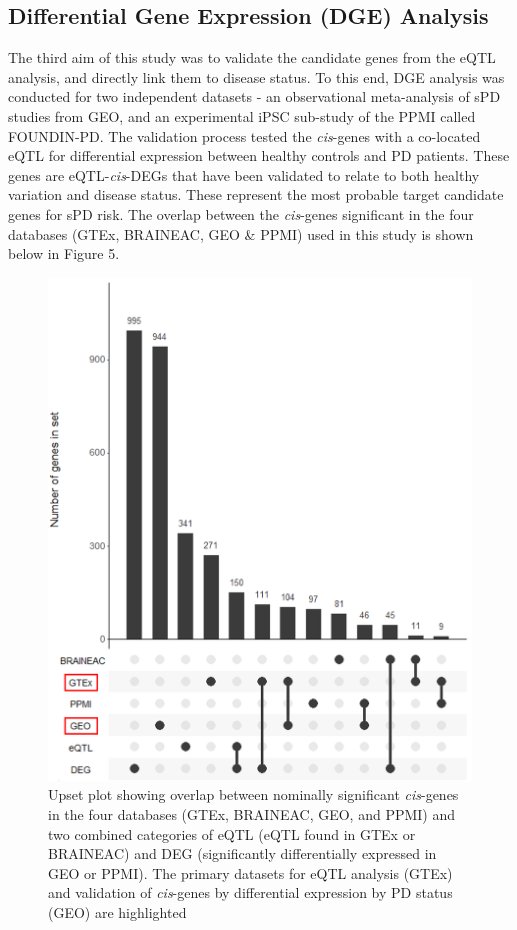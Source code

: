 \documentclass{article}
\begin{document}
\subsection{Differential Gene Expression (DGE) Analysis}
\label{subsec:DGE}
The third aim of this study was to validate the candidate genes from the eQTL analysis, and directly link them to disease status. To this end, DGE analysis was conducted for two independent datasets - an observational meta-analysis of sPD studies from GEO\cite{Barrett2012NCBISetsupdate}, and an experimental iPSC sub-study of the PPMI called FOUNDIN-PD\cite{Bressan2023TheMechanism}. The validation process tested the \textit{cis}-genes with a co-located eQTL for differential expression between healthy controls and PD patients. These genes are  eQTL-\textit{cis}-DEGs that have been validated to relate to both healthy variation and disease status. These represent the most probable target candidate genes for sPD risk. The overlap between the \textit{cis}-genes significant in the four databases (GTEx, BRAINEAC, GEO \& PPMI) used in this study is shown below in Figure 5.
\newpage
\begin{figure}[!h]
    \centering
    \includegraphics[width=1\linewidth]{Thesis/thesis images/Upsetplot.png}
    \caption{Upset plot\cite{Conway2017UpSetR:Properties.} showing overlap between nominally significant \textit{cis}-genes in the four databases (GTEx, BRAINEAC, GEO, and PPMI) and two combined categories of eQTL (eQTL found in GTEx or BRAINEAC) and DEG (significantly differentially expressed in GEO or PPMI). The primary datasets for eQTL analysis (GTEx) and validation of \textit{cis}-genes by differential expression by PD status (GEO) are highlighted}
    \label{fig:enter-label}
\end{figure}
\end{document}
